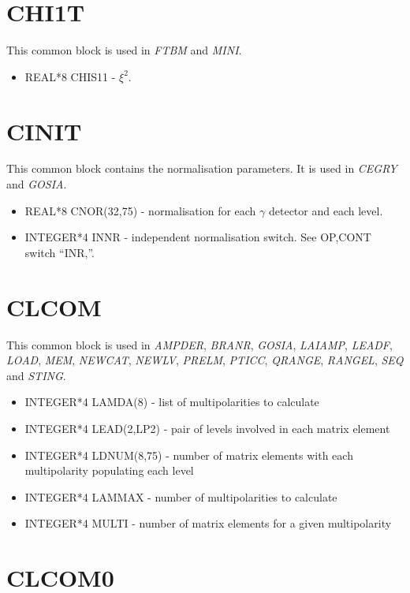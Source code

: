 \section{CHI1T}

This common block is used in \emph{FTBM} and \emph{MINI}.

\begin{itemize}
\item REAL*8 CHIS11 - $\xi^2$.
\end{itemize}

\section{CINIT}

This common block contains the normalisation parameters. It is used in \emph{
CEGRY} and \emph{GOSIA}.

\begin{itemize}
\item REAL*8 CNOR(32,75) - normalisation for each $\gamma$ detector and each
level.
\item INTEGER*4 INNR - independent normalisation switch. See OP,CONT switch
``INR,''.
\end{itemize}

\section{CLCOM}

This common block is used in \emph{AMPDER}, \emph{BRANR}, \emph{GOSIA}, \emph{
LAIAMP}, \emph{LEADF}, \emph{LOAD}, \emph{MEM}, \emph{NEWCAT}, \emph{NEWLV}, \emph{
PRELM}, \emph{PTICC}, \emph{QRANGE}, \emph{RANGEL}, \emph{SEQ} and \emph{STING}.

\begin{itemize}
\item INTEGER*4 LAMDA(8) - list of multipolarities to calculate
\item INTEGER*4 LEAD(2,LP2) - pair of levels involved in each matrix element
\item INTEGER*4 LDNUM(8,75) - number of matrix elements with each multipolarity populating each level
\item INTEGER*4 LAMMAX - number of multipolarities to calculate
\item INTEGER*4 MULTI - number of matrix elements for a given multipolarity
\end{itemize}

\section{CLCOM0}

